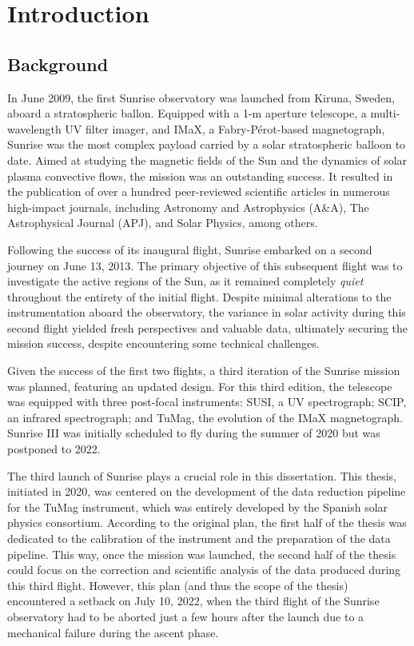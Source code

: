 \chapter{Introduction}

\section{Background}

In June 2009, the first Sunrise observatory \citep{SunriseI} was launched from Kiruna, Sweden, aboard a stratospheric ballon. Equipped with a 1-m aperture telescope, a multi-wavelength UV filter imager, and IMaX, a Fabry-Pérot-based magnetograph, Sunrise was the most complex payload carried by a solar stratospheric balloon to date. Aimed at studying the magnetic fields of the Sun and the dynamics of solar plasma convective flows, the mission was an outstanding success. It resulted in the publication of over a hundred peer-reviewed scientific articles in numerous high-impact journals, including Astronomy and Astrophysics (A\&A), The Astrophysical Journal (APJ), and Solar Physics, among others.

Following the success of its inaugural flight, Sunrise embarked on a second journey \citep{SunriseII} on June 13, 2013. The primary objective of this subsequent flight was to investigate the active regions of the Sun, as it remained completely \textit{quiet} throughout the entirety of the initial flight. Despite minimal alterations to the instrumentation aboard the observatory, the variance in solar activity during this second flight yielded fresh perspectives and valuable data, ultimately securing the mission success, despite encountering some technical challenges.

Given the success of the first two flights, a third iteration of the Sunrise mission was planned, featuring an updated design. For this third edition, the telescope was equipped with three post-focal instruments: SUSI, a UV spectrograph; SCIP, an infrared spectrograph; and TuMag, the evolution of the IMaX magnetograph. Sunrise III was initially scheduled to fly during the summer of 2020 but was postponed to 2022.

The third launch of Sunrise plays a crucial role in this dissertation. This thesis, initiated in 2020, was centered on the development of the data reduction pipeline for the TuMag instrument, which was entirely developed by the Spanish solar physics consortium. According to the original plan, the first half of the thesis was dedicated to the calibration of the instrument and the preparation of the data pipeline. This way, once the mission was launched, the second half of the thesis could focus on the correction and scientific analysis of the data produced during this third flight. However, this plan (and thus the scope of the thesis) encountered a setback on July 10, 2022, when the third flight of the Sunrise observatory had to be aborted just a few hours after the launch due to a mechanical failure during the ascent phase.


